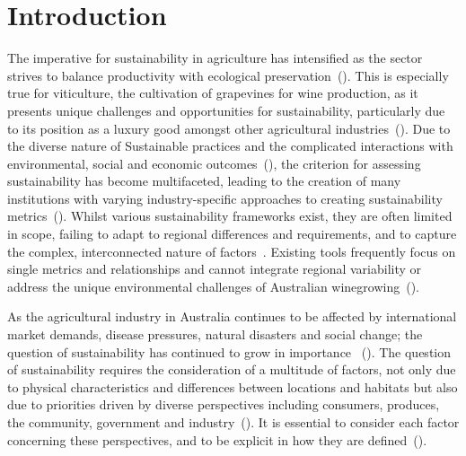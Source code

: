 \documentclass[10pt,letterpaper]{article}
\begin{document}
\section*{Introduction}
The imperative for sustainability in agriculture has intensified as the sector strives to balance productivity with ecological preservation~(\cite{baianoOverviewSustainabilityWine2021,corboEnvironmentalSustainabilityPrograms2014}). This is especially true for viticulture, the cultivation of grapevines for wine production, as it presents unique challenges and opportunities for sustainability, particularly due to its position as a luxury good amongst other agricultural industries~(\cite{longbottomExploringLinksSustainability2018,ferraraLifeCycleAssessment2018}). Due to the diverse nature of Sustainable practices and the complicated interactions with environmental, social and economic outcomes~(\cite{beaumelleBiodiversityConservationEcosystem2023}), the criterion for assessing sustainability has become multifaceted, leading to the creation of many institutions with varying industry-specific approaches to creating sustainability metrics~(\cite{baianoOverviewSustainabilityWine2021,montalvo-falconSustainabilityResearchWine2023, wayeCarbonFootprintsFood2008}). Whilst various sustainability frameworks exist, they are often limited in scope, failing to adapt to regional differences and requirements, and to capture the complex, interconnected nature of factors~\cite{santiniSustainabilityWineIndustry2013, christ2013critical}. Existing tools frequently focus on single metrics and relationships and cannot integrate regional variability or address the unique environmental challenges of Australian winegrowing~(\cite{baianoOverviewSustainabilityWine2021,leask2019sustainable, abbalDecisionSupportSystem2016}). 

As the agricultural industry in Australia continues to be affected by international market demands, disease pressures, natural disasters and social change; the question of sustainability has continued to grow in importance ~(\cite{wineaustraliaNationalVintageReport2022,wineaustraliaNationalVintageReport2020,wineaustraliaNationalVintageReport2021,cassonMultidisciplinaryApproachAssess2022}). The question of sustainability requires the consideration of a multitude of factors, not only due to physical characteristics and differences between locations and habitats but also due to priorities driven by diverse perspectives including consumers, produces, the community, government and industry~(\cite{baianoOverviewSustainabilityWine2021,wayeCarbonFootprintsFood2008}). It is essential to consider each factor concerning these perspectives, and to be explicit in how they are defined~(\cite{santiago-brownSustainabilityAssessmentWineGrape2015}).
\end{document}
